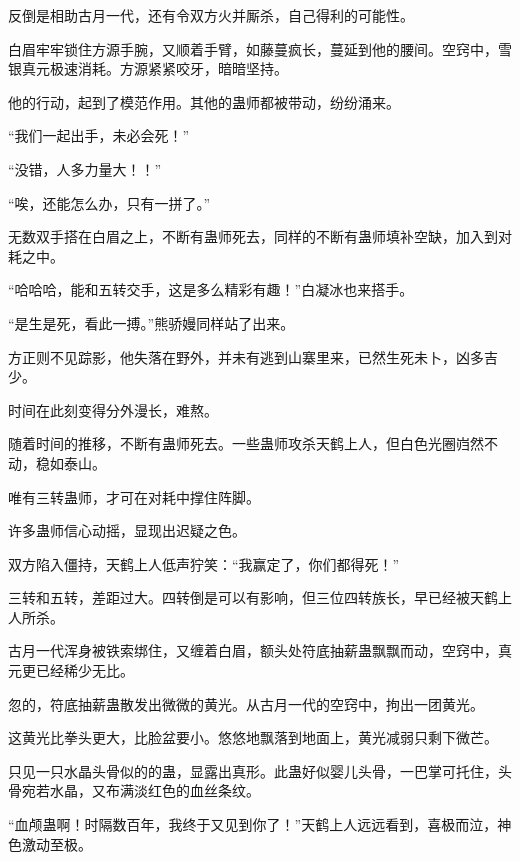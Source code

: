 \begin{this_body}
反倒是相助古月一代，还有令双方火并厮杀，自己得利的可能性。

白眉牢牢锁住方源手腕，又顺着手臂，如藤蔓疯长，蔓延到他的腰间。空窍中，雪银真元极速消耗。方源紧紧咬牙，暗暗坚持。

他的行动，起到了模范作用。其他的蛊师都被带动，纷纷涌来。

“我们一起出手，未必会死！”

“没错，人多力量大！！”

“唉，还能怎么办，只有一拼了。”

无数双手搭在白眉之上，不断有蛊师死去，同样的不断有蛊师填补空缺，加入到对耗之中。

“哈哈哈，能和五转交手，这是多么精彩有趣！”白凝冰也来搭手。

“是生是死，看此一搏。”熊骄嫚同样站了出来。

方正则不见踪影，他失落在野外，并未有逃到山寨里来，已然生死未卜，凶多吉少。

时间在此刻变得分外漫长，难熬。

随着时间的推移，不断有蛊师死去。一些蛊师攻杀天鹤上人，但白色光圈岿然不动，稳如泰山。

唯有三转蛊师，才可在对耗中撑住阵脚。

许多蛊师信心动摇，显现出迟疑之色。

双方陷入僵持，天鹤上人低声狞笑：“我赢定了，你们都得死！”

三转和五转，差距过大。四转倒是可以有影响，但三位四转族长，早已经被天鹤上人所杀。

古月一代浑身被铁索绑住，又缠着白眉，额头处符底抽薪蛊飘飘而动，空窍中，真元更已经稀少无比。

忽的，符底抽薪蛊散发出微微的黄光。从古月一代的空窍中，拘出一团黄光。

这黄光比拳头更大，比脸盆要小。悠悠地飘落到地面上，黄光减弱只剩下微芒。

只见一只水晶头骨似的的蛊，显露出真形。此蛊好似婴儿头骨，一巴掌可托住，头骨宛若水晶，又布满淡红色的血丝条纹。

“血颅蛊啊！时隔数百年，我终于又见到你了！”天鹤上人远远看到，喜极而泣，神色激动至极。

\end{this_body}

